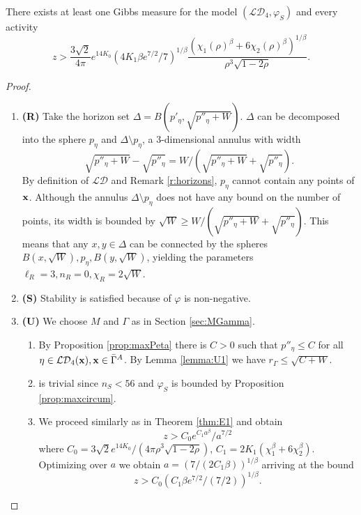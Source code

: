 \begin{theorem}\label{thm:E3}
	There exists at least one Gibbs measure for the model $(\mathcal {LD}_4,\varphi_S)$ and every activity 
	$$z> \frac{3\sqrt 2}{4\pi}e^{14 K_0}   (4K_1 \beta e^{7/2}/7)^{1/\beta} \frac{(\chi_1(\rho)^\beta + 6\chi_2(\rho)^\beta)^{1/\beta}}{\rho^3 \sqrt{1-2\rho}}.$$
\end{theorem}
\begin{proof}
\begin{enumerate}[]
	\item \textbf{(R)} Take the horizon set $\Delta = B(p'_\eta, \sqrt{p''_\eta + W})$. $\Delta$ can be decomposed into the sphere $p_\eta$ and $\Delta \setminus p_\eta$, a 3-dimensional annulus with width 
		$$\sqrt{p''_\eta+W} -\sqrt{p''_\eta}=W/(\sqrt{p''_\eta+W} + \sqrt{p''_\eta}).$$
		By definition of $\mathcal {LD}$ and Remark \ref{r:horizons}, $p_\eta$  cannot contain any points of ${\mathbf{x}}$. Although the annulus $\Delta \setminus p_\eta$ does not have any bound on the number of points, its width is bounded by $\sqrt W \geq  W/(\sqrt{p''_\eta+W} + \sqrt{p''_\eta})$. This means that any $x,y\in \Delta$ can be connected by the spheres $B(x,\sqrt W), p_\eta, B(y,\sqrt W)$, yielding the parameters $\ell_R = 3,n_R=0,\chi_R=2\sqrt W$.
	\item \textbf{(S)} Stability is satisfied because of $\varphi$ is non-negative.
	\item \textbf{(U)} We choose $M$ and $\Gamma$ as in Section \ref{sec:MGamma}.
		\begin{enumerate}[(U1)]
			\item By Proposition \ref{prop:maxPeta} there is $C>0$ such that $p''_\eta\leq C$ for all $\eta \in \mathcal {LD}_4({\mathbf{x}}), {\mathbf{x}} \in \bar\Gamma^A$. By Lemma \ref{lemma:U1} we have $r_\Gamma\leq \sqrt{C + W}$.
			\item is trivial since $n_S<56$ and $\varphi_{S}$ is bounded by Proposition \ref{prop:maxcircum}.
			\item We proceed similarly as in Theorem \ref{thm:E1} and obtain
				$$z>C_0 e^{C_1 a^\beta} / a^{7/2}$$
				where $C_0=3 \sqrt 2 e^{14K_0} / (4\pi \rho^3 \sqrt{1-2\rho})$, $C_1 = 2K_1(\chi_1^\beta + 6\chi_2^\beta)$. Optimizing over $a$ we obtain $a=(7/(2C_1\beta))^{1/\beta}$ arriving at the bound
				$$z> C_0 (C_1 \beta e^{7/2} / (7/2))^{1/\beta}.$$
		\end{enumerate}
\end{enumerate}
\end{proof}



